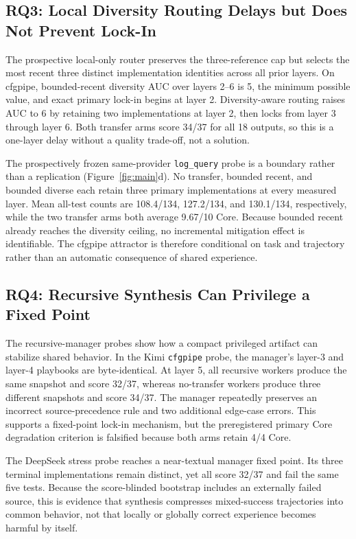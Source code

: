 \documentclass[letterpaper]{article}
\begin{document}
\subsection{RQ3: Local Diversity Routing Delays but Does Not Prevent Lock-In}

The prospective local-only router preserves the three-reference cap but selects
the most recent three distinct implementation identities across all prior layers.
On cfgpipe, bounded-recent diversity AUC over layers 2--6 is 5, the minimum
possible value, and exact primary lock-in begins at layer 2. Diversity-aware
routing raises AUC to 6 by retaining two implementations at layer 2, then locks
from layer 3 through layer 6. Both transfer arms score 34/37 for all 18 outputs,
so this is a one-layer delay without a quality trade-off, not a solution.

The prospectively frozen same-provider \texttt{log\_query} probe is a boundary
rather than a replication (Figure~\ref{fig:main}d). No transfer, bounded recent,
and bounded diverse each retain three primary implementations at every measured
layer. Mean all-test counts are 108.4/134, 127.2/134, and 130.1/134, respectively,
while the two transfer arms both average 9.67/10 Core. Because bounded recent
already reaches the diversity ceiling, no incremental mitigation effect is
identifiable. The cfgpipe attractor is therefore conditional on task and trajectory
rather than an automatic consequence of shared experience.

\subsection{RQ4: Recursive Synthesis Can Privilege a Fixed Point}

The recursive-manager probes show how a compact privileged artifact can stabilize
shared behavior. In the Kimi \texttt{cfgpipe} probe, the manager's layer-3 and
layer-4 playbooks are byte-identical. At layer 5, all recursive workers produce
the same snapshot and score 32/37, whereas no-transfer workers produce three
different snapshots and score 34/37. The manager repeatedly preserves an
incorrect source-precedence rule and two additional edge-case errors. This
supports a fixed-point lock-in mechanism, but the preregistered primary Core
degradation criterion is falsified because both arms retain 4/4 Core.

The DeepSeek stress probe reaches a near-textual manager fixed point. Its three
terminal implementations remain distinct, yet all score 32/37 and fail the same
five tests. Because the score-blinded bootstrap includes an externally failed
source, this is evidence that synthesis compresses mixed-success trajectories
into common behavior, not that locally or globally correct experience becomes
harmful by itself.
\end{document}
